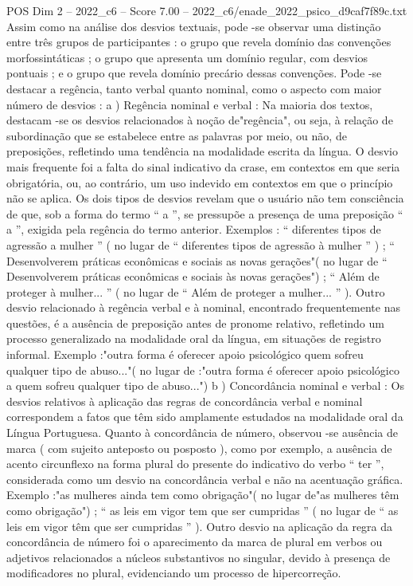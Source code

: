 \begin{textsample}{POS Dim 2 – 2022\_c6 – Score 7.00 – 2022\_c6/enade\_2022\_psico\_d9caf7f89c.txt}
Assim como na análise dos desvios textuais, pode -se observar uma distinção entre três grupos de participantes : o grupo que revela domínio das convenções morfossintáticas ; o grupo que apresenta um domínio regular, com desvios pontuais ; e o grupo que revela domínio precário dessas convenções.
Pode -se destacar a regência, tanto verbal quanto nominal, como o aspecto com maior número de desvios : a ) Regência nominal e verbal : Na maioria dos textos, destacam -se os desvios relacionados à noção de"regência", ou seja, à relação de subordinação que se estabelece entre as palavras por meio, ou não, de preposições, refletindo uma tendência na modalidade escrita da língua.
O desvio mais frequente foi a falta do sinal indicativo da crase, em contextos em que seria obrigatória, ou, ao contrário, um uso indevido em contextos em que o princípio não se aplica.
Os dois tipos de desvios revelam que o usuário não tem consciência de que, sob a forma do termo “ a ”, se pressupõe a presença de uma preposição “ a ”, exigida pela regência do termo anterior.
Exemplos : “ diferentes tipos de agressão a mulher ” ( no lugar de “ diferentes tipos de agressão à mulher ” ) ; “ Desenvolverem práticas econômicas e sociais as novas gerações"( no lugar de “ Desenvolverem práticas econômicas e sociais às novas gerações") ; “ Além de proteger à mulher... ” ( no lugar de “ Além de proteger a mulher... ” ).
Outro desvio relacionado à regência verbal e à nominal, encontrado frequentemente nas questões, é a ausência de preposição antes de pronome relativo, refletindo um processo generalizado na modalidade oral da língua, em situações de registro informal.
Exemplo :"outra forma é oferecer apoio psicológico quem sofreu qualquer tipo de abuso..."( no lugar de :"outra forma é oferecer apoio psicológico a quem sofreu qualquer tipo de abuso...") b ) Concordância nominal e verbal : Os desvios relativos à aplicação das regras de concordância verbal e nominal correspondem a fatos que têm sido amplamente estudados na modalidade oral da Língua Portuguesa.
Quanto à concordância de número, observou -se ausência de marca ( com sujeito anteposto ou posposto ), como por exemplo, a ausência de acento circunflexo na forma plural do presente do indicativo do verbo “ ter ”, considerada como um desvio na concordância verbal e não na acentuação gráfica.
Exemplo :"as mulheres ainda tem como obrigação"( no lugar de"as mulheres têm como obrigação") ; “ as leis em vigor tem que ser cumpridas ” ( no lugar de “ as leis em vigor têm que ser cumpridas ” ).
Outro desvio na aplicação da regra da concordância de número foi o aparecimento da marca de plural em verbos ou adjetivos relacionados a núcleos substantivos no singular, devido à presença de modificadores no plural, evidenciando um processo de hipercorreção.

\end{textsample}

